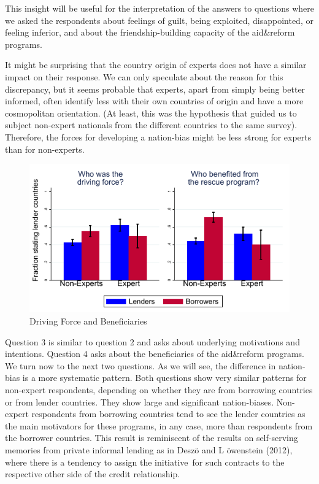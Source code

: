 This insight will be useful for the
interpretation of the answers to questions where we asked the respondents
about feelings of guilt, being exploited, disappointed, or feeling inferior,
and about the friendship-building capacity of the aid\&reform programs.

It might be surprising that the country origin of experts does not have a
similar impact on their response. We can only speculate about the reason for
this discrepancy, but it seems probable that experts, apart from simply being
better informed, often identify less with their own countries of origin and have 
a more cosmopolitan orientation. (At
least, this was the hypothesis that guided us to subject non-expert
nationals from the different countries to the same survey). Therefore, the
forces for developing a nation-bias might be less strong for experts than for non-experts. 

\begin{figure}
    \centering
      \caption{Driving Force and Beneficiaries}
    \includegraphics[scale=1.2]{graph3.pdf}
  
    \label{fig:my_label}
\end{figure}
Question 3 is similar to question 2 and asks about underlying motivations
and intentions. Question 4 asks about the beneficiaries of the aid\&reform
programs.  We
turn now to the next two questions. As we
will see, the difference in nation-bias is a more systematic pattern. Both questions show very similar patterns for non-expert
respondents, depending on whether they are from borrowing countries or from
lender countries. They show large and significant nation-biases. Non-expert respondents
from borrowing countries tend to see the lender countries as the main
motivators for these programs, in any case, more than respondents from the
borrower countries. This result is reminiscent of the results on
self-serving memories from private informal lending as in Desz\"{o} and L%
\"{o}wenstein (2012), where there is a tendency to assign the initiative\
for such contracts to the respective other side of the credit relationship. 


